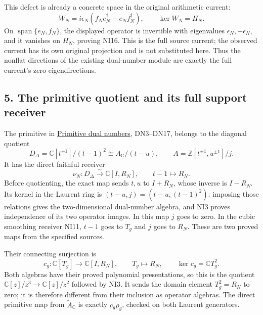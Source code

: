 \documentclass[
]{article}
\begin{document}
This defect is already a concrete space in the original arithmetic
current: \[
W_N=i\epsilon_N(f_Ne_N^\dagger-e_Nf_N^\dagger),\qquad
\ker W_N=H_N.
\tag{NI16}
\] On \(\operatorname{span}\{e_N,f_N\}\), the displayed operator is
invertible with eigenvalues \(\epsilon_N,-\epsilon_N\), and it vanishes
on \(H_N\), proving NI16. This is the full source current; the observed
current has its own original projection and is not substituted here.
Thus the nonflat directions of the existing dual-number module are
exactly the full current's zero eigendirections.

\subsection{5. The primitive quotient and its full support
receiver}\label{the-primitive-quotient-and-its-full-support-receiver}

The primitive in
\href{https://github.com/KokunoYumeto/zeta-function-research-reader/blob/6af54ea3c8ef99127af327f3103e086c68d482c2/workbenches/splitzero-tandem/branches/identity-absorber-square/PRIMITIVE_DUAL_NUMBERS.md}{Primitive
dual numbers}, DN3--DN17, belongs to the diagonal quotient \[
D_\Delta=\mathbb C[t^{\pm1}]/(t-1)^2
\cong A_{\mathbb C}/(t-u),\qquad A=\mathbb Z[t^{\pm1},u^{\pm1}]/j.
\] It has the direct faithful receiver \[
\nu_N:D_\Delta\xrightarrow{\sim}\mathbb C[I,R_N],
\qquad \overline{t-1}\longmapsto R_N.
\tag{NI17}
\] Before quotienting, the exact map sends \(t,u\) to \(I+R_N\), whose
inverse is \(I-R_N\). Its kernel in the Laurent ring is
\((t-u,j)=(t-u,(t-1)^2)\): imposing those relations gives the
two-dimensional dual-number algebra, and NI3 proves independence of its
two operator images. In this map \(j\) goes to zero. In the cubic
smoothing receiver NI11, \(t-1\) goes to \(T_g\) and \(j\) goes to
\(R_N\). These are two proved maps from the specified sources.

Their connecting surjection is \[
c_g:\mathbb C[T_g]\longrightarrow\mathbb C[I,R_N],
\qquad T_g\longmapsto R_N,\qquad
\ker c_g=\mathbb C T_g^2.
\tag{NI18}
\] Both algebras have their proved polynomial presentations, so this is
the quotient \(\mathbb C[z]/z^3\to\mathbb C[z]/z^2\) followed by NI3. It
sends the domain element \(T_g^2=R_N\) to zero; it is therefore
different from their inclusion as operator algebras. The direct
primitive map from \(\widetilde A_{\mathbb C}\) is exactly
\(c_g\rho_g\), checked on both Laurent generators.
\end{document}

